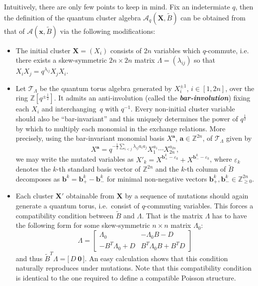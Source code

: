 \documentclass[pdftex]{sigma}
\newcommand{\bfa}{\mathbf{a}}
\newcommand{\bfb}{\mathbf{b}}
\newcommand{\bfx}{\mathbf{x}}
\newcommand{\bfX}{\mathbf{X}}
\newcommand{\cA}{\mathcal{A}}
\newcommand{\cT}{\mathcal{T}}
\newcommand{\half}{{\frac{1}{2}}}
\newcommand{\ZZ}{\mathbb{Z}}
\newcommand{\newword}[1]{\textbf{\emph{#1}}}
\begin{document}
  Intuitively, there are only few points to keep in mind.
  Fix an indetermiate $q$, then the definition of the quantum cluster algebra $\cA_q(\bfX,\widetilde B)$ can be obtained from that of $\cA(\bfx,\widetilde B)$ via the following modifications:
  \begin{itemize}
    \item 
      The initial cluster $\bfX=(X_i)$ consists of $2n$ variables which $q$-commute, i.e. there exists a skew-symmetric $2n\times 2n$ matrix $\Lambda=(\lambda_{ij})$ so that $X_iX_j=q^{\lambda_{ij}}X_jX_i$.  
    
    \item 
      Let $\cT_\Lambda$ be the quantum torus algebra generated by $X_i^{\pm1}$, $i\in[1,2n]$, over the ring $\ZZ[q^{\pm\half}]$.
      It admits an anti-involution (called the \newword{bar-involution}) fixing each $X_i$ and interchanging~$q$ with $q^{-1}$.
      Every non-initial cluster variable should also be ``bar-invariant'' and this uniquely determines the power of $q^\half$ by which to multiply each monomial in the exchange relations.  
      More precisely, using the bar-invariant monomial basis $X^\bfa$, $\bfa\in\ZZ^{2n}$, of $\cT_\Lambda$ given by
      \[
        X^\bfa=q^{-\half\sum\limits_{i<j}\lambda_{ij}a_ia_j}X_1^{a_1}\cdots X_{2n}^{a_{2n}},
      \]
      we may write the mutated variables as $X'_k=X^{\bfb_+^k-\varepsilon_k}+X^{\bfb_-^k-\varepsilon_k}$, where $\varepsilon_k$ denotes the $k$-th standard basis vector of $\ZZ^{2n}$ and the $k$-th column of $\widetilde{B}$ decomposes as $\bfb^k=\bfb^k_+-\bfb^k_-$ for minimal non-negative vectors $\bfb^k_+,\bfb^k_-\in\ZZ_{\ge0}^{2n}$.

    \item 
      Each cluster $\bfX'$ obtainable from $\bfX$ by a sequence of mutations should again generate a quantum torus, i.e.\ consist of $q$-commuting variables.
      This forces a compatibility condition between $\widetilde{B}$ and $\Lambda$.
      That is the matrix $\Lambda$ has to have the following form for some skew-symmetric $n\times n$ matrix $\Lambda_0$:
      \[
        \Lambda
        =
        \left[
          \begin{array}{cc}
            \Lambda_0 & -\Lambda_0B-D\\ 
            -B^T\Lambda_0+D & B^T\Lambda_0B+B^TD
          \end{array}
        \right]
      \]
      and thus $\widetilde{B}^T\Lambda=\big[\,D\ \boldsymbol{0}\,\big]$.
      An easy calculation shows that this condition naturally reproduces under mutations.
      Note that this compatibility condition is identical to the one required to define a compatible Poisson structure.

  \end{itemize}
\end{document}
